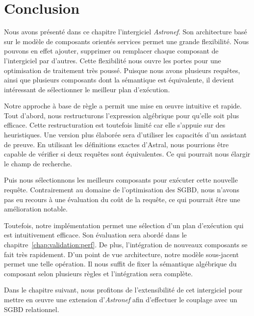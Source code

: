 \section{Conclusion}\label{sec:contrib:astronef:conclusion}
Nous avons présenté dans ce chapitre l'intergiciel \textit{Astronef}. Son architecture basé sur le modèle de composants orientés services permet une grande flexibilité. Nous pouvons en effet ajouter, supprimer ou remplacer chaque composant de l'intergiciel par d'autres. Cette flexibilité nous ouvre les portes pour une optimisation de traitement très poussé. Puisque nous avons plusieurs requêtes, ainsi que plusieurs composants dont la sémantique est équivalente, il devient intéressant de sélectionner le meilleur plan d'exécution.

Notre approche à base de règle a permit une mise en œuvre intuitive et rapide. Tout d'abord, nous restructurons l'expression algébrique pour qu'elle soit plus efficace. Cette restructuration est toutefois limité car elle s'appuie sur des heuristiques. Une version plus élaborée sera d'utiliser les capacités d'un assistant de preuve. En utilisant les définitions exactes d'Astral, nous pourrions être capable de vérifier si deux requêtes sont équivalentes. Ce qui pourrait nous élargir le champ de recherche.

Puis nous sélectionnons les meilleurs composants pour exécuter cette nouvelle requête. Contrairement au domaine de l'optimisation des SGBD, nous n'avons pas eu recours à une évaluation du coût de la requête, ce qui pourrait être une amélioration notable.

Toutefois, notre implémentation permet une sélection d'un plan d'exécution qui est intuitivement efficace. Son évaluation sera abordé dans le chapitre~\ref{chap:validation:perf}. De plus, l'intégration de nouveaux composants se fait très rapidement. D'un point de vue architecture, notre modèle sous-jacent permet une telle opération. Il nous suffit de fixer la sémantique algébrique du composant selon plusieurs règles et l'intégration sera complète.

Dans le chapitre suivant, nous profitons de l'extensibilité de cet intergiciel pour mettre en œuvre une extension d'\textit{Astronef} afin d'effectuer le couplage avec un SGBD relationnel.
